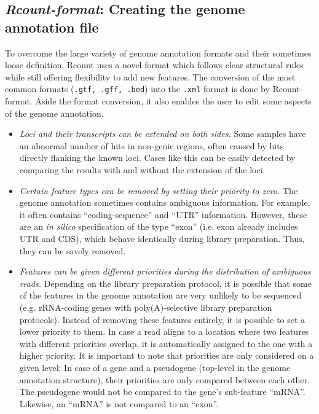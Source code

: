 \documentclass[a4paper,10pt]{article}
\begin{document}
\subsection{\textit{Rcount-format}: Creating the genome annotation file}\label{annoDescription}
To overcome the large variety of genome annotation formats and their sometimes loose definition, Rcount uses a novel format which follows clear structural rules while still offering flexibility to add new features. The conversion of the most common formats (\texttt{.gtf, .gff, .bed}) into the \texttt{.xml} format is done by Rcount-format. Aside the format conversion, it also enables the user to edit some aspects of the genome annotation.
\begin{itemize}
 \item \textit{Loci and their transcripts can be extended on both sides.}\newline
Some samples have an abnormal number of hits in non-genic regions, often caused by hits directly flanking the known loci. Cases like this can be easily detected by comparing the results with and without the extension of the loci.
 \item \textit{Certain feature types can be removed by setting their priority to zero.}\newline
The genome annotation sometimes contains ambiguous information. For example, it often contains ``coding-sequence'' and ``UTR'' information. However, these are an \textit{in silico} specification of the type ``exon'' (i.e. exon already includes UTR and CDS), which behave identically during library preparation. Thus, they can be savely removed.
 \item \textit{Features can be given different priorities during the distribution of ambiguous reads.}\newline
Depending on the library preparation protocol, it is possible that some of the features in the genome annotation are very unlikely to be sequenced (e.g. rRNA-coding genes with poly(A)-selective library preparation protocols). Instead of removing these features entirely, it is possible to set a lower priority to them. In case a read aligns to a location where two features with different priorities overlap, it is automatically assigned to the one with a higher priority. It is important to note that priorities are only considered on a given level: In case of a gene and a pseudogene (top-level in the genome annotation structure), their priorities are only compared between each other. The pseudogene would not be compared to the gene's sub-feature ``mRNA''. Likewise, an ``mRNA'' is not compared to an ``exon''.

\end{itemize}
\end{document}
